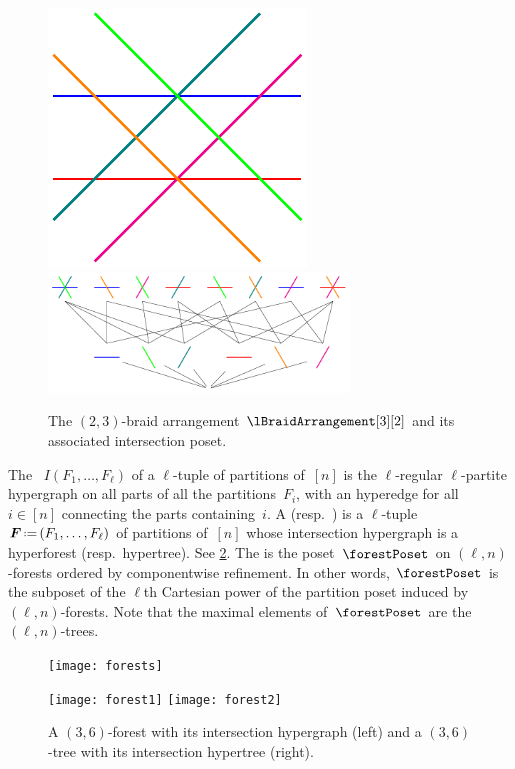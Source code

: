 \begin{figure}
\centering
\includegraphics{figures/B23.pdf}
\includegraphics[width=8cm]{figures/PosetB23.pdf}
\caption{The $(2,3)$-braid arrangement $\lBraidArrangement[3][2]$ and its associated intersection poset. \label{fig:B23}}
\end{figure}


\begin{definition}
The ~$I(F_1, \dots, F_\ell)$ of a $\ell$-tuple of partitions of~$[n]$ is the $\ell$-regular $\ell$-partite hypergraph on all parts of all the partitions~$F_i$, with an hyperedge for all~$i \in [n]$ connecting the parts containing~$i$.
A  (resp.~) is a $\ell$-tuple~$\b{F} \eqdef (F_1, \dots, F_\ell)$ of partitions of~$[n]$ whose intersection hypergraph is a hyperforest (resp.~hypertree).
See \cref{fig:forests}.
The  is the poset~$\forestPoset$ on $(\ell,n)$-forests ordered by componentwise refinement.
In other words, $\forestPoset$ is the subposet of the $\ell$th Cartesian power of the partition poset induced by $(\ell,n)$-forests.
Note that the maximal elements of~$\forestPoset$ are the $(\ell, n)$-trees.
%
\begin{figure}
	\centerline{\texttt{[image: forests]}}
	\texttt{[image: forest1]}
	\texttt{[image: forest2]}
	\caption{A $(3,6)$-forest with its intersection hypergraph (left) and a $(3,6)$-tree with its intersection hypertree (right). }
	\label{fig:forests}
\end{figure}
\end{definition}

